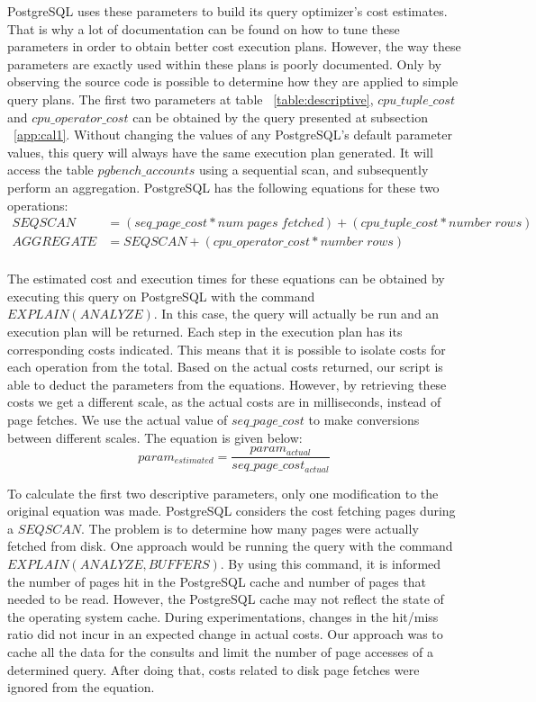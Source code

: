 PostgreSQL uses these parameters to build its query optimizer's cost estimates. That is why a lot of documentation can be found on how to tune these parameters in order to obtain better cost execution plans. However, the way these parameters are exactly used within these plans is poorly documented. Only by observing the source code is possible to determine how they are applied to simple query plans. The first two parameters at table ~\ref{table:descriptive}, $cpu\_tuple\_cost$ and $cpu\_operator\_cost$ can be obtained by the query presented at subsection ~\ref{app:cal1}. Without changing the values of any PostgreSQL's default parameter values, this query will always have the same execution plan generated. It will access the table $pgbench\_accounts$ using a sequential scan, and subsequently perform an aggregation. PostgreSQL has the following equations for these two operations:
\begin{equation}
  \begin{split}
      SEQSCAN &= ( seq\_page\_cost * num\; pages \; fetched ) + ( cpu\_tuple\_cost * number\; rows ) \\
      AGGREGATE &= SEQSCAN + ( cpu\_operator\_cost * number\; rows) \\
  \end{split}
\end{equation}

The estimated cost and execution times for these equations can be obtained by executing this query on PostgreSQL with the command $EXPLAIN (ANALYZE)$. In this case, the query will actually be run and an execution plan will be returned. Each step in the execution plan has its corresponding costs indicated. This means that it is possible to isolate costs for each operation from the total. Based on the actual costs returned, our script is able to deduct the parameters from the equations. However, by retrieving these costs we get a different scale, as the actual costs are in milliseconds, instead of page fetches. We use the actual value of $seq\_page\_cost$ to make conversions between different scales. The equation is given below:
\[
 param_{estimated} = \frac{param_{actual}}{seq\_page\_cost_{actual}}
\]

To calculate the first two descriptive parameters, only one modification to the original equation was made. PostgreSQL considers the cost fetching pages  during a $SEQSCAN$. The problem is to determine how many pages were actually fetched from disk. One approach would be running the query with the command $EXPLAIN (ANALYZE,BUFFERS)$. By using this command, it is informed the number of pages hit in the PostgreSQL cache and number of pages that needed to be read. However, the PostgreSQL cache may not reflect the state of the operating system cache. During experimentations, changes in the hit/miss ratio did not incur in an expected change in actual costs. Our approach was to cache all the data for the consults and limit the number of page accesses of a determined query. After doing that, costs related to disk page fetches were ignored from the equation.


